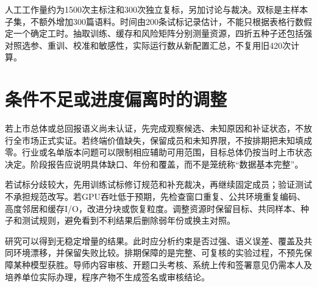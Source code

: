 人工工作量约为1500次主标注和300次独立复标，另加讨论与裁决。双标是主样本子集，不额外增加300篇语料。时间由200条试标记录估计，不能只根据表格行数假定一个确定工时。抽取训练、缓存和风险矩阵分别测量资源，四折五种子还包括强对照选参、重训、校准和敏感性，实际运行数从新配置汇总，不复用旧420次计算。

\section{条件不足或进度偏离时的调整}
若上市总体或总回报语义尚未认证，先完成观察候选、未知原因和补证状态，不放行全市场正式实证。若终端价值缺失，保留成员和未知界限，不按排期把未知填成零。行业或名单版本问题可以限制相应辅助可用范围，目标总体仍按当时上市状态决定。阶段报告应说明具体缺口、年份和覆盖，而不是笼统称“数据基本完整”。

若试标分歧较大，先用训练试标修订规范和补充裁决，再继续固定成员；验证测试不承担规范改写。若GPU吞吐低于预期，先检查窗口重复、公共环境重复编码、高度邻居和缓存I/O，改进分块或恢复粒度。调整资源时保留目标、共同样本、种子和测试规则，避免看到不利结果后删除弱年份或换主对照。

研究可以得到无稳定增量的结果。此时应分析约束是否过强、语义误差、覆盖及共同环境漂移，并保留失败比较。排期保障的是完整、可复核的实验过程，不预先保障某种模型获胜。导师内容审核、开题口头考核、系统上传和签署意见仍需本人及培养单位实际办理，程序产物不生成签名或审核结论。
